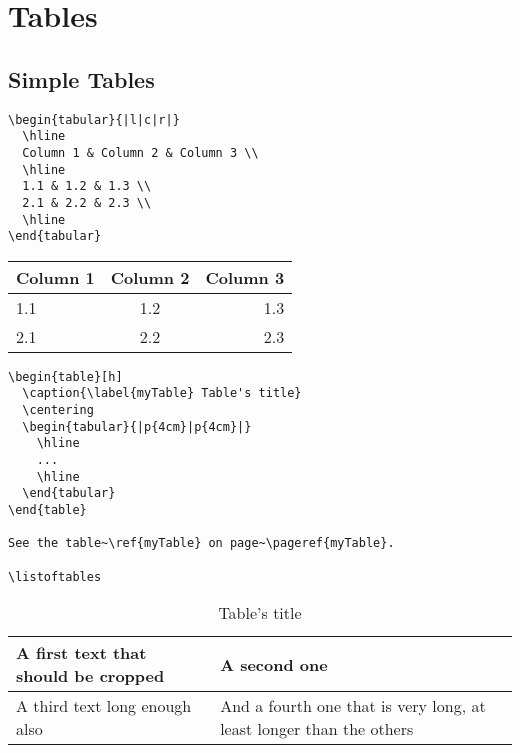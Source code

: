 \chapter{Tables}

\section{Simple Tables}

\begin{LaTeXsource}
\begin{verbatim}
\begin{tabular}{|l|c|r|}
  \hline
  Column 1 & Column 2 & Column 3 \\
  \hline
  1.1 & 1.2 & 1.3 \\
  2.1 & 2.2 & 2.3 \\
  \hline
\end{tabular}
\end{verbatim}
\end{LaTeXsource}

\begin{Results}
\begin{tabular}{|l|c|r|}
  \hline
  Column 1 & Column 2 & Column 3 \\
  \hline
  1.1 & 1.2 & 1.3 \\
  2.1 & 2.2 & 2.3 \\
  \hline
\end{tabular}
\end{Results}

\pagebreak
\begin{LaTeXsource}[Floating]
\begin{verbatim}
\begin{table}[h]
  \caption{\label{myTable} Table's title}
  \centering
  \begin{tabular}{|p{4cm}|p{4cm}|}
    \hline
    ...
    \hline
  \end{tabular}
\end{table}

See the table~\ref{myTable} on page~\pageref{myTable}.

\listoftables
\end{verbatim}
\end{LaTeXsource}

\begin{table}[h]
  \caption{\label{myTable} Table's title}
  \centering
  \begin{tabular}{|p{4cm}|p{4cm}|}
    \hline
      A first text that should be cropped &
      A second one \\
    \hline
      A third text long enough also &
      And a fourth one that is very long,
      at least longer than the others \\
    \hline
  \end{tabular}
\end{table}

